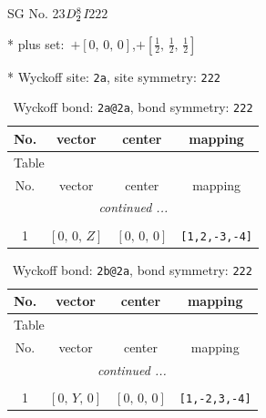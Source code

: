 \documentclass[fleqn,8pt]{jsarticle}
\begin{document}
\setcounter{MaxMatrixCols}{32}

\renewcommand{\tablename}{Table~}
\renewcommand{\figurename}{Figure~}
\begin{center}
\LARGE
SG No. 23\quad$D_{\rm 2}^{8}$\quad$I222$\quad[ orthorhombic ]
\end{center}

* plus set:\,\,\,$+\left[ 0,\, 0,\, 0 \right]$,\quad $+\left[ \frac{1}{2},\, \frac{1}{2},\, \frac{1}{2} \right]$


* Wyckoff site: {\tt 2a}, site symmetry: {\tt 222}
\renewcommand{\arraystretch}{1.2}
\begin{longtable}{cccc}
\caption{Wyckoff bond: {\tt 2a@2a}, bond symmetry: {\tt 222}}
 \\
 \hline \hline
No. & vector & center & mapping \\ \hline \endfirsthead

\multicolumn{3}{l}{\tablename\ \thetable{}} \\
 \hline \hline
No. & vector & center & mapping \\ \hline \endhead

 \hline \hline
\multicolumn{3}{r}{\footnotesize\it continued ...} \\ \endfoot

 \hline \hline
\multicolumn{3}{r}{} \\ \endlastfoot

1 & $\left[ 0,\, 0,\, Z \right]$ & $\left[ 0,\, 0,\, 0 \right]$ & {\tt [1,2,-3,-4]} \\
\end{longtable}
\renewcommand{\arraystretch}{1.2}
\begin{longtable}{cccc}
\caption{Wyckoff bond: {\tt 2b@2a}, bond symmetry: {\tt 222}}
 \\
 \hline \hline
No. & vector & center & mapping \\ \hline \endfirsthead

\multicolumn{3}{l}{\tablename\ \thetable{}} \\
 \hline \hline
No. & vector & center & mapping \\ \hline \endhead

 \hline \hline
\multicolumn{3}{r}{\footnotesize\it continued ...} \\ \endfoot

 \hline \hline
\multicolumn{3}{r}{} \\ \endlastfoot

1 & $\left[ 0,\, Y,\, 0 \right]$ & $\left[ 0,\, 0,\, 0 \right]$ & {\tt [1,-2,3,-4]} \\
\end{longtable}
\end{document}
